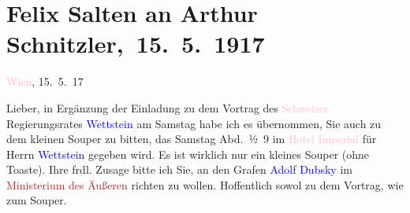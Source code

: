 

\renewcommand{\erwaehntePersonen}{Personen: Adolf Oswald von Dubsky-Třembomyslic, Frieda Pollak, Felix Salten, Oscar Wettstein}
\renewcommand{\erwaehnteInstitutionen}{Institutionen: Ministerium für Äußeres}
\renewcommand{\erwaehnteOrte}{Orte: Hotel Imperial, Schweiz, Wien}
\renewcommand{\erwaehnteWerke}{}
\section[ Felix Salten an Arthur Schnitzler, 15. 5. 1917]{Felix Salten an Arthur Schnitzler, 15. 5. 1917}
\nopagebreak{}
\rehead{ }\normalsize\beginnumbering{}
\toendnotes[C]{\smallbreak\pagebreak[2]}
\toendnotes[C]{\smallbreak}
\pstart
           \raggedleft{}{\pb}\textcolor{pink}{Wien}{}\ledrightnote{\textcolor{pink}{Wien}}, 15. 5. 17\pend
           
\pstart{}Lieber,\pend
\pstart
           in Ergänzung der Einladung zu dem Vortrag des \textcolor{pink}{Schweizer}{}\ledrightnote{\textcolor{pink}{Schweiz}} Regierungsrates \textcolor{blue}{Wettstein}{}\ledrightnote{\textcolor{blue}{Oscar Wettstein}}
               am Samstag habe ich es übernommen, Sie auch zu dem
               kleinen Souper zu bitten, das Samstag{ }Abd. ½ 9 im \textcolor{pink}{Hotel Imperial}{}\ledrightnote{\textcolor{pink}{Hotel Imperial}} für Herrn \textcolor{blue}{Wettstein}{}\ledrightnote{\textcolor{blue}{Oscar Wettstein}}
               gegeben wird. Es ist wirklich nur ein kleines Souper (ohne Toaste). Ihre frdl. Zusage
               bitte ich Sie, an den Grafen \textcolor{blue}{Adolf Dubsky}{}\ledrightnote{\textcolor{blue}{Adolf Oswald von Dubsky-Třembomyslic}} im
                  \textcolor{brown}{Ministerium des Äußeren}{}\ledrightnote{\textcolor{brown}{Ministerium für Äußeres}} richten zu wollen.
               Hoffentlich \label{K_L03566-1v}\label{K_L03566-1h} sowol zu dem Vortrag, wie zum Souper.\pend
           

